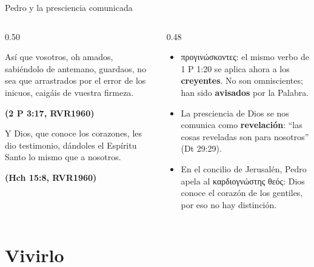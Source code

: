 \documentclass[hyperref={bookmarks=false},aspectratio=169]{beamer}
\newcommand{\grc}[1]{\foreignlanguage{ancientgreek}{#1}}
\newcommand{\fuente}[1]{\par\hfill{\upshape\bfseries\footnotesize\textcolor{azul}{#1}}}
\newcommand{\destacar}[1]{\textbf{\textcolor{azul}{#1}}}
\begin{document}
\begin{frame}{Pedro y la presciencia comunicada}
\begin{columns}[t,onlytextwidth]
\begin{column}{0.50\textwidth}
\begin{cita}Así que vosotros, oh amados, sabiéndolo de antemano, guardaos, no sea que arrastrados por el error de los inicuos, caigáis de vuestra firmeza.\fuente{(2 P 3:17, RVR1960)}\end{cita}
\begin{cita}Y Dios, que conoce los corazones, les dio testimonio, dándoles el Espíritu Santo lo mismo que a nosotros.\fuente{(Hch 15:8, RVR1960)}\end{cita}
\end{column}
\begin{column}{0.48\textwidth}\small
\begin{itemize}
\item \grc{προγινώσκοντες}: el mismo verbo de 1 P 1:20 se aplica ahora a los \destacar{creyentes}. No son omniscientes; han sido \destacar{avisados} por la Palabra.
\item La presciencia de Dios se nos comunica como \destacar{revelación}: ``las cosas reveladas son para nosotros'' (Dt 29:29).
\item En el concilio de Jerusalén, Pedro apela al \grc{καρδιογνώστης θεός}: Dios conoce el corazón de los gentiles, por eso no hay distinción.
\end{itemize}
\end{column}
\end{columns}
\end{frame}

\section{Vivirlo}
\end{document}
